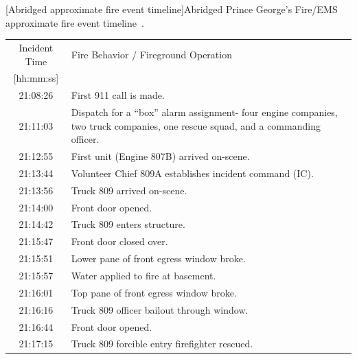 \documentclass[12pt,oneside]{book}
\begin{document}
\begin{table}[!h]
\centering
{}[Abridged approximate fire event timeline]{Abridged Prince George's Fire/EMS approximate fire event timeline~\cite{PGCounty2013}.}\label{tab:fire_info}
\begin{tabular}{cl}
\toprule[1.5pt]
Incident Time              &  Fire Behavior / Fireground Operation  \\
{[hh:mm:ss]}               &                                        \\
\midrule
21:08:26   & First 911 call is made. \\[.25cm]
\multirow{3}{*}{21:11:03}  &   \multirow{3}{*}{\parbox{10cm} {Dispatch for a ``box'' alarm assignment- four engine companies, two truck companies, one rescue squad, and a commanding officer.}}    \\
                           &         \\
                           &         \\[.25cm]
21:12:55  &  First unit (Engine 807B) arrived on-scene.  \\[.25cm]
21:13:44  & Volunteer Chief 809A establishes incident command (IC).   \\[.25cm]
21:13:56  & Truck 809 arrived on-scene. \\[.25cm]
21:14:00  & Front door opened. \\[.25cm]
21:14:42  & Truck 809 enters structure. \\[.25cm]
21:15:47  & Front door closed over. \\[.25cm]
21:15:51  & Lower pane of front egress window broke. \\[.25cm]
21:15:57  & Water applied to fire at basement. \\[.25cm]
21:16:01  & Top pane of front egress window broke. \\[.25cm]
21:16:16  & Truck 809 officer bailout through window. \\[.25cm]
21:16:44  & Front door opened. \\[.25cm]
21:17:15  & Truck 809 forcible entry firefighter rescued. \\[.25cm]
\bottomrule[1.25pt]
\end{tabular}\par
\end{table}
\end{document}
